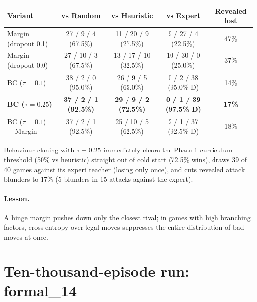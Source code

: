 \begin{center}
\small
\begin{tabular}{lcccc}
\toprule
Variant & vs Random & vs Heuristic & vs Expert & Revealed lost \\
\midrule
Margin (dropout 0.1) & 27 / 9 / 4 (67.5\%) & 11 / 20 / 9 (27.5\%) & 9 / 27 / 4 (22.5\%) & 47\% \\
Margin (dropout 0.0) & 27 / 10 / 3 (67.5\%) & 13 / 17 / 10 (32.5\%) & 10 / 30 / 0 (25.0\%) & 37\% \\
BC ($\tau = 0.1$) & 38 / 2 / 0 (95.0\%) & 26 / 9 / 5 (65.0\%) & 0 / 2 / 38 (95.0\% D) & 14\% \\
\textbf{BC ($\tau = 0.25$)} & \textbf{37 / 2 / 1 (92.5\%)} & \textbf{29 / 9 / 2 (72.5\%)} & \textbf{0 / 1 / 39 (97.5\% D)} & \textbf{17\%} \\
BC ($\tau = 0.1$) + Margin & 37 / 2 / 1 (92.5\%) & 25 / 10 / 5 (62.5\%) & 2 / 1 / 37 (92.5\% D) & 18\% \\
\bottomrule
\end{tabular}
\end{center}
Behaviour cloning with $\tau = 0.25$ immediately clears the Phase 1 curriculum threshold (50\% vs
heuristic) straight out of cold start (72.5\% wins), draws 39 of 40 games against its expert
teacher (losing only once), and cuts revealed attack blunders to 17\% (5 blunders in 15 attacks
against the expert).

\paragraph{Lesson.} A hinge margin pushes down only the closest rival; in games with high branching
factors, cross-entropy over legal moves suppresses the entire distribution of bad moves at once.

\section{Ten-thousand-episode run: formal\_14}
\label{sec:formal14}

